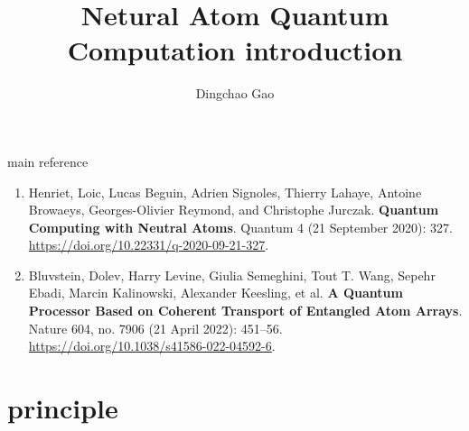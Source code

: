 \documentclass[18 pt]{beamer}
\title{Netural Atom Quantum Computation introduction}
\author[Gcc]{Dingchao Gao}
\institute[ISCAS]{Institute of Software Chinese Academy of Sciences}
\begin{document}
\begin{frame}[plain]
  \titlepage
\end{frame}
\begin{frame}{main reference}
  \begin{enumerate}
    \item Henriet, Loic, Lucas Beguin, Adrien Signoles, Thierry Lahaye, Antoine Browaeys, Georges-Olivier Reymond, and Christophe Jurczak. \textbf{Quantum Computing with Neutral Atoms}. Quantum 4 (21 September 2020): 327. \url{https://doi.org/10.22331/q-2020-09-21-327}.
    \item Bluvstein, Dolev, Harry Levine, Giulia Semeghini, Tout T. Wang, Sepehr Ebadi, Marcin Kalinowski, Alexander Keesling, et al. \textbf{A Quantum Processor Based on Coherent Transport of Entangled Atom Arrays}. Nature 604, no. 7906 (21 April 2022): 451–56. \url{https://doi.org/10.1038/s41586-022-04592-6}.
  \end{enumerate}
\end{frame}
\section{principle}
\end{document}
